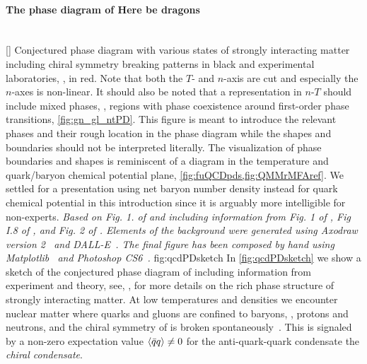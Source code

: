 \paragraph{The phase diagram of \qcd{} \dash{} Here be dragons}\label{paragraph:introQCDPD}\mbox{}\\%
	[]%
	{%
		Conjectured \qcd{} phase diagram with various states of strongly interacting matter including chiral symmetry breaking patterns in black and experimental laboratories, \cf{} \ccite{\qcdExpLaboratoriesU,\qcdExpLaboratoriesC,\qcdExpLaboratoriesNS}, in red.
		Note that both the $T$- and $n$-axis are cut and especially the $n$-axes is non-linear. 
		It should also be noted that a representation in $n$-$T$ should include mixed phases, \ie{}, regions with phase coexistence around first-order phase transitions, \cf{} \cref{fig:gn_gl_ntPD}.
		This figure is meant to introduce the relevant phases and their rough location in the phase diagram while the shapes and boundaries should not be interpreted literally.
		The visualization of phase boundaries and shapes is reminiscent of a diagram in the temperature and quark/baryon chemical potential plane, \cf{} \cref{fig:fuQCDpds,fig:QMMrMFAref}.
		We settled for a presentation using net baryon number density instead for quark chemical potential in this introduction since it is arguably more intelligible for non-experts.
		\textit{Based on Fig. 1. of  and including information from Fig. 1 of , Fig I.8 of , and Fig. 2 of . Elements of the background were generated using \textit{Axodraw version 2}~\cite{Collins:2016aya,axodraw2CTAN} and \textit{DALL-E}~\cite{DALL-E}. The final figure has been composed by hand using \textit{Matplotlib}~\cite{Hunter:2007} and \textit{Photoshop CS6}~\cite{photoshopCS6}.}
	}%
	{fig:qcdPDsketch}%
In \cref{fig:qcdPDsketch} we show a sketch of the conjectured phase diagram of \qcd{} including information from experiment and theory, see, \eg{},  for more details on the rich phase structure of strongly interacting matter.
At low temperatures and densities we encounter nuclear matter where quarks and gluons are confined to baryons, \eg{}, protons and neutrons, and the chiral symmetry of \qcd{} is broken spontaneously~\cite{Nambu:1961tp,Nambu:1961fr}.
This  is signaled by a non-zero expectation value $\langle \bar{q} q \rangle\neq 0$ for the anti-quark-quark condensate \dash{} the \textit{chiral condensate}.
